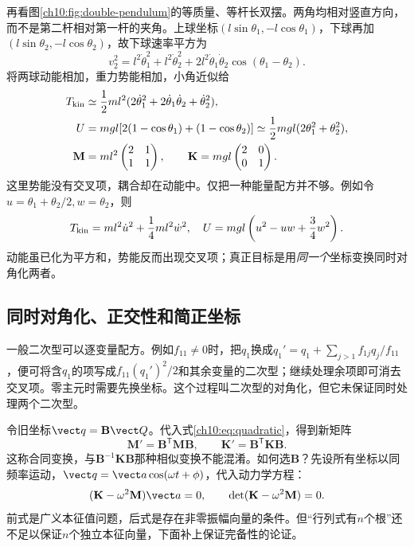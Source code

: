 再看图\ref{ch10:fig:double-pendulum}的等质量、等杆长双摆。两角均相对竖直方向，而不是第二杆相对第一杆的夹角。上球坐标$(l\sin\theta_1,-l\cos\theta_1)$，下球再加$(l\sin\theta_2,-l\cos\theta_2)$，故下球速率平方为
\[
 v_2^2=l^2\dot\theta_1^2+l^2\dot\theta_2^2
 +2l^2\dot\theta_1\dot\theta_2\cos(\theta_1-\theta_2).
\]
\chTenDoublePendulumFigure
将两球动能相加，重力势能相加，小角近似给
\begin{align*}
 T_{\rm kin}&\simeq\frac12ml^2(2\dot\theta_1^2+2\dot\theta_1\dot\theta_2+\dot\theta_2^2),\\
 U&=mgl[2(1-\cos\theta_1)+(1-\cos\theta_2)]
 \simeq\frac12mgl(2\theta_1^2+\theta_2^2),\\
 \mathbf M&=ml^2\begin{pmatrix}2&1\\1&1\end{pmatrix},\qquad
 \mathbf K=mgl\begin{pmatrix}2&0\\0&1\end{pmatrix}.
\end{align*}
这里势能没有交叉项，耦合却在动能中。仅把一种能量配方并不够。例如令$u=\theta_1+\theta_2/2,w=\theta_2$，则
\[
 T_{\rm kin}=ml^2\dot u^2+\frac14ml^2\dot w^2,
 \quad U=mgl\left(u^2-uw+\frac34w^2\right).
\]
动能虽已化为平方和，势能反而出现交叉项；真正目标是用\emph{同一个}坐标变换同时对角化两者。

\subsection{同时对角化、正交性和简正坐标}
一般二次型可以逐变量配方。例如$f_{11}\ne0$时，把$q_1$换成$q_1'=q_1+\sum_{j>1}f_{1j}q_j/f_{11}$，便可将含$q_1$的项写成$f_{11}(q_1')^2/2$和其余变量的二次型；继续处理余项即可消去交叉项。零主元时需要先换坐标。这个过程叫二次型的对角化，但它未保证同时处理两个二次型。

令旧坐标$\vect q=\mathbf B\vect Q$。代入式\eqref{ch10:eq:quadratic}，得到新矩阵
\[
 \mathbf M'=\mathbf B^{\mathsf T}\mathbf M\mathbf B,
 \qquad\mathbf K'=\mathbf B^{\mathsf T}\mathbf K\mathbf B.
\]
这称合同变换，与$\mathbf B^{-1}\mathbf K\mathbf B$那种相似变换不能混淆。如何选$\mathbf B$？先设所有坐标以同频率运动，$\vect q=\vect a\cos(\omega t+\phi)$，代入动力学方程：
\begin{equation}\label{ch10:eq:eigen}
 (\mathbf K-\omega^2\mathbf M)\vect a=0,
 \qquad\det(\mathbf K-\omega^2\mathbf M)=0.
\end{equation}
前式是广义本征值问题，后式是存在非零振幅向量的条件。但“行列式有$n$个根”还不足以保证$n$个独立本征向量，下面补上保证完备性的论证。

